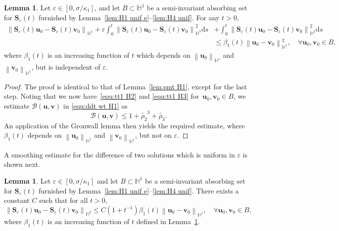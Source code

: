 \documentclass[11pt, reqno]{amsart}
\theoremstyle{definition}
\newtheorem{lemma}[theorem]{Lemma}
\numberwithin{equation}{section}
\newcommand{\bff}{\boldsymbol}
\newcommand{\bb}{\mathbb}
\newcommand{\ds}{\mathrm{d}s}
\newcommand{\norm}[2]{\left\|{#1}\right\|_{#2}}
\begin{document}
\begin{lemma}\label{lem:Se H1}
Let $\varepsilon\in [0, \sigma/\kappa_1]$, and let $B\subset \bb{H}^1$ be a semi-invariant absorbing set for $\bff{S}_\varepsilon(t)$ furnished by Lemma~\ref{lem:H1 unif e}--\ref{lem:H4 unif}. For any $t>0$,
\begin{align*}
     \norm{\bff{S}_\varepsilon(t) \bff{u}_0 - \bff{S}_\varepsilon(t) \bff{v}_0}{\bb{H}^1}
     +
     \varepsilon \int_0^t \norm{\bff{S}_\varepsilon(t) \bff{u}_0 - \bff{S}_\varepsilon(t) \bff{v}_0}{\bb{H}^3}^2 \ds
     &+
     \int_0^t \norm{\bff{S}_\varepsilon(t) \bff{u}_0 - \bff{S}_\varepsilon(t) \bff{v}_0}{\bb{H}^2}^2 \ds
     \nonumber\\
     &\leq
     \beta_1(t) \norm{\bff{u}_0-\bff{v}_0}{\bb{H}^1}^2, 
     \quad \forall \bff{u}_0,\bff{v}_0\in B,
\end{align*}
where $\beta_1 (t)$ is an increasing function of $t$ which depends on $\norm{\bff{u}_0}{\bb{H}^1}$ and $\norm{\bff{v}_0}{\bb{H}^1}$, but is independent of $\varepsilon$.
\end{lemma}

\begin{proof}
The proof is identical to that of Lemma~\ref{lem:smt H1}, except for the last step. Noting that we now have~\eqref{equ:tt1 H2} and \eqref{equ:tt1 H3} for~$\bff{u}_0, \bff{v}_0\in B$, we estimate $\mathcal{B}(\bff{u},\bff{v})$ in \eqref{equ:ddt wt H1} as
\begin{equation*}
    \mathcal{B}(\bff{u},\bff{v}) \leq 1+\widetilde{\rho_2}^3 + \widetilde{\rho_3}.
\end{equation*}
An application of the Gronwall lemma then yields the required estimate, where $\beta_1(t)$ depends on $\norm{\bff{u}_0}{\bb{H}^1}$ and $\norm{\bff{v}_0}{\bb{H}^1}$, but not on $\varepsilon$.
\end{proof}

A smoothing estimate for the difference of two solutions which is uniform in $\varepsilon$ is shown next.

\begin{lemma}\label{lem:Se u0 v0}
Let $\varepsilon\in [0, \sigma/\kappa_1]$ and let $B \subset \bb{H}^1$ be a semi-invariant absorbing set for $\bff{S}_\varepsilon(t)$ furnished by Lemma~\ref{lem:H1 unif e}--\ref{lem:H4 unif}. There exists a constant $C$ such that for all $t>0$,
\begin{equation}\label{equ:S eps H2}
    \norm{\bff{S}_\varepsilon(t) \bff{u}_0 - \bff{S}_\varepsilon(t) \bff{v}_0}{\bb{H}^2}
    \leq
    C\left(1+t^{-1}\right) \beta_1 (t) \norm{\bff{u}_0-\bff{v}_0}{\bb{H}^1},
    \quad \forall \bff{u}_0,\bff{v}_0\in B,
\end{equation}
where $\beta_1 (t)$ is an increasing function of $t$ defined in Lemma~\ref{lem:Se H1}.
\end{lemma}
\end{document}
